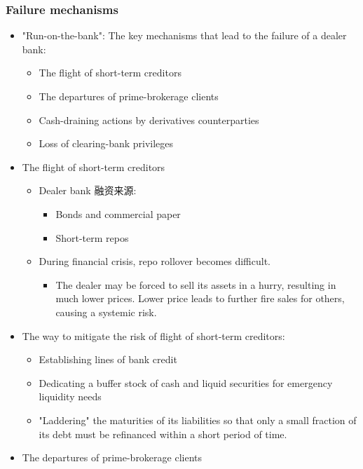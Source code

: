 \subsubsection{Failure mechanisms}
\begin{itemize}
\item "Run-on-the-bank": The key mechanisms that lead to the failure of a dealer bank:
    \begin{itemize}
    \item The flight of short-term creditors
    \item The departures of prime-brokerage clients
    \item Cash-draining actions by derivatives counterparties
    \item Loss of clearing-bank privileges
    \end{itemize}
\item The flight of short-term creditors
    \begin{itemize}
    \item Dealer bank 融资来源:
        \begin{itemize}
        \item Bonds and commercial paper
        \item  Short-term repos
        \end{itemize}
    \item During financial crisis, repo rollover becomes difficult.
        \begin{itemize}
        \item The dealer may be forced to sell its assets in a hurry, resulting in much lower prices. Lower price leads to further fire sales for others, causing a systemic risk.
        \end{itemize}
    \end{itemize}
\item The way to mitigate the risk of flight of short-term creditors:
    \begin{itemize}
    \item Establishing lines of bank credit
    \item Dedicating a buffer stock of cash and liquid securities for emergency liquidity needs
    \item "Laddering" the maturities of its liabilities so that only a small fraction of its debt must be refinanced within a short period of time.
    \end{itemize}
\item The departures of prime-brokerage clients
    \begin{itemize}

\end{itemize}
\end{itemize}
